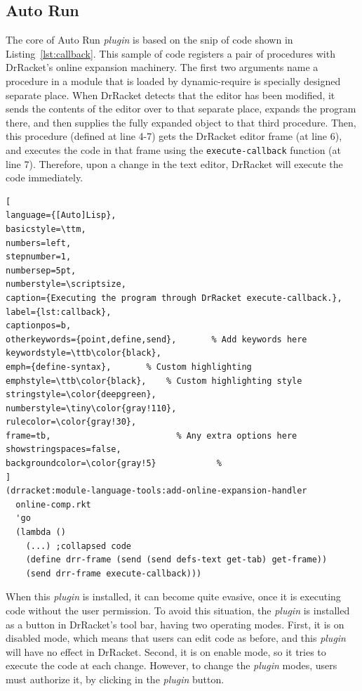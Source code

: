 \subsection{Auto Run}

The core of Auto Run \textit{plugin} is based on the snip of code shown in Listing~\ref{lst:callback}. This sample of code registers a pair of procedures with DrRacket’s online expansion machinery. The first two arguments name a procedure in a module that is loaded by dynamic-require is specially designed separate place. When DrRacket detects that the editor has been modified, it sends the contents of the editor over to that separate place, expands the program there, and then supplies the fully expanded object to that third procedure. Then, this procedure (defined at line 4-7) gets the DrRacket editor frame (at line 6), and executes the code in that frame using the \texttt{execute-callback} function (at line 7). Therefore, upon a change in the text editor, DrRacket will execute the code immediately. 

\begin{lstlisting}[
language={[Auto]Lisp},
basicstyle=\ttm,
numbers=left,
stepnumber=1,
numbersep=5pt,                   
numberstyle=\scriptsize, 
caption={Executing the program through DrRacket execute-callback.},
label={lst:callback},
captionpos=b, 
otherkeywords={point,define,send},       % Add keywords here
keywordstyle=\ttb\color{black},
emph={define-syntax},       % Custom highlighting
emphstyle=\ttb\color{black},    % Custom highlighting style
stringstyle=\color{deepgreen},
numberstyle=\tiny\color{gray!110},
rulecolor=\color{gray!30},
frame=tb,                         % Any extra options here
showstringspaces=false,
backgroundcolor=\color{gray!5}            % 
]
(drracket:module-language-tools:add-online-expansion-handler
  online-comp.rkt
  'go
  (lambda ()
    (...) ;collapsed code
    (define drr-frame (send (send defs-text get-tab) get-frame))
    (send drr-frame execute-callback)))
\end{lstlisting}

When this \textit{plugin} is installed, it can become quite evasive, once it is executing code without the user permission. To avoid this situation, the \textit{plugin} is installed as a button in DrRacket's tool bar, having two operating modes. First, it is on disabled mode, which means that users can edit code as before, and this \textit{plugin} will have no effect in DrRacket. Second, it is on enable mode, so it tries to execute the code at each change. However, to change the \textit{plugin} modes, users must authorize it, by clicking in the \textit{plugin} button.

